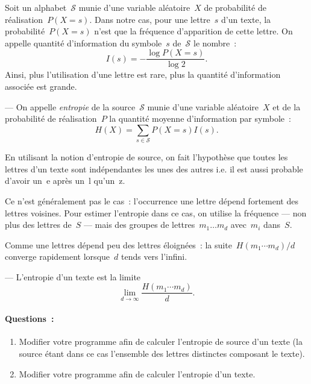 \begin{exercice}
  Soit un  alphabet~$\mathcal{S}$ munie d'une variable al\'eatoire~$X$
  de probabilit\'e de r\'ealisation~$P(X=s)$. Dans notre cas, pour une
  lettre~$s$ d'un  texte,  la   probabilit\'e~$P(X=s)$  n'est   que la
  fr\'equence  d'apparition de cette   lettre.  On appelle  quantit\'e
  d'information du symbole~$s$ de~${\mathcal{S}}$ le nombre~:
  $$
  I(s) = - \frac{\log P(X=s)}{\log 2}.
  $$
  Ainsi,  plus l'utilisation    d'une  lettre est rare,  plus   la
  quantit\'e d'information associ\'ee est grande.
  \par\medskip
  \begin{definition}[C.E.~Shannon 1940] --- 
    On appelle \emph{entropie}  de la source~$\mathcal{S}$ munie d'une
    variable    al\'eatoire~$X$    et   de    la    probabilit\'e   de
    r\'ealisation~$P$   la  quantit\'e   moyenne d'information     par
    symbole~:
    $$
    H(X) = \sum_{s\in\mathcal{S}} P(X=s)I(s).
    $$
  \end{definition}  
  \par\medskip
  En  utilisant la notion d'entropie de  source, on fait l'hypoth\`ese
  que toutes les lettres d'un texte  sont ind\'ependantes les unes des
  autres i.e. il est aussi probable d'avoir un~e apr\`es un~l qu'un~z.
  \par\medskip
  Ce n'est g\'en\'eralement pas le cas~: l'occurrence une lettre d\'epend fortement
  des   lettres voisines. Pour  estimer l'entropie   dans  ce  cas, on
  utilise la fr\'equence --- non plus des  lettres de~$S$ --- mais des
  groupes de lettres~${m_{1}\ldots m_{d}}$ avec~$m_{i}$ dans~$S$.
  \par
  Comme  une  lettres  d\'epend  peu  des  lettres \'eloign\'ees~:  la
  suite~${H(m_{1}\cdots   m_{d})/d}$  converge rapidement  lorsque~$d$
  tends vers l'infini.
  \begin{definition} --- L'entropie d'un texte est la limite
    $$
    \lim_{d\rightarrow \infty} \frac{H(m_{1}\cdots   m_{d})}{d}.
    $$
   \end{definition}
  \paragraph{Questions~:}
  \begin{enumerate}
  \item Modifier votre programme afin de calculer l'entropie de source
    d'un texte  (la source \'etant  dans ce cas l'ensemble des lettres
    distinctes composant le texte).
  \item Modifier  votre programme afin   de  calculer l'entropie  d'un
    texte.
  \end{enumerate}


\end{exercice}
